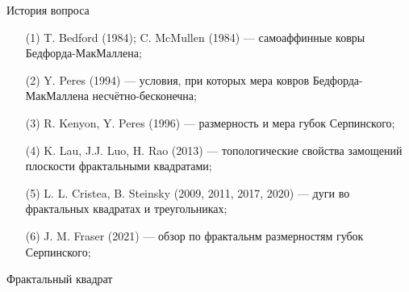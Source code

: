 \documentclass[aspectratio=1610, 10pt, notheorems]{beamer}
\newtheorem{definition}  {Определение}
\begin{document}
\begin{frame}{История вопроса}
\begin{itemize}
    \item[(1)] T. Bedford (1984); C. McMullen (1984) --- самоаффинные ковры Бедфорда-МакМаллена;
    \item[(2)] Y. Peres (1994) --- условия, при которых мера ковров Бедфорда-МакМаллена несчётно-бесконечна;
    \item[(3)] R. Kenyon, Y. Peres (1996) --- размерность и мера губок Серпинского;
    \item[(4)] K. Lau, J.J. Luo, H. Rao (2013) --- топологические свойства замощений плоскости фрактальными квадратами;
    \item[(5)] L. L. Cristea, B. Steinsky (2009, 2011, 2017, 2020) --- дуги во фрактальных квадратах и треугольниках;
    \item[(6)] J. M. Fraser (2021) --- обзор по фрактальнм размерностям губок Серпинского;
\end{itemize}
\end{frame}


\begin{frame}{Фрактальный квадрат}
\end{frame}
\end{document}
